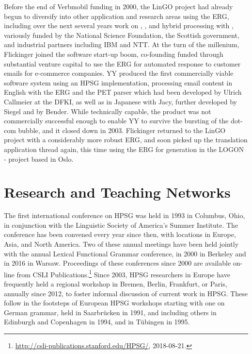 \documentclass[output=paper]{langsci/langscibook}
\begin{document}
Before the end of Verbmobil funding in 2000, the LinGO project had already begun to diversify into other application and research areas using the ERG, including over the next several years work on , , and hybrid processing with , variously funded by the National Science Foundation, the Scottish government, and industrial partners including IBM and NTT.  At the turn of the millenium, Flickinger joined the software start-up boom, co-founding  funded through substantial venture capital to use the ERG for automated response to customer emails for e-commerce companies.  YY produced the first commercially viable software system using an HPSG implementation, processing email content in English with the ERG and the PET parser \citep{callmeier00} which had been developed by Ulrich Callmeier at the DFKI, as well as in Japanese with Jacy, further developed by Siegel and by Bender.  While technically capable, the product was not commercially successful enough to enable YY to survive the bursting of the dot-com bubble, and it closed down in 2003.  Flickinger returned to the LinGO project with a considerably more robust ERG, and soon picked up the translation application thread again, this time using the ERG for generation in the LOGON -  project \citep{Lon:Oep:Ber:04} based in Oslo.


\section{Research and Teaching Networks}

The first international conference on HPSG was held in 1993 in Columbus, Ohio, in conjunction with the Linguistic Society of America's Summer Institute.  The conference has been convened every year since then, with locations in Europe, Asia, and North America.  Two of these annual meetings have been held jointly with the annual Lexical Functional Grammar conference, in 2000 in Berkeley and in 2016 in Warsaw.  Proceedings of these conferences since 2000 are available on-line from CSLI Publications.\footnote{\url{http://csli-publications.stanford.edu/HPSG/}, 2018-08-21.}  Since 2003, HPSG researchers in Europe have frequently held a regional workshop in Bremen, Berlin, Frankfurt, or Paris, annually since 2012, to foster informal discussion of current work in HPSG.  These follow in the footsteps of European HPSG workshops starting with one on German grammar, held in Saarbr{\"u}cken in 1991, and including others in Edinburgh and Copenhagen in 1994, and in T{\"u}bingen in 1995.
\end{document}
